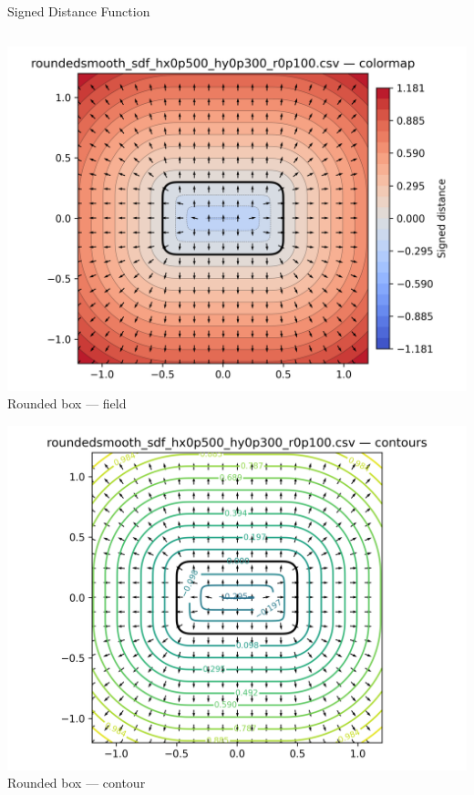 \documentclass[10pt, aspectratio=169]{beamer}
\begin{document}
\begin{frame}{Signed Distance Function}
\begin{columns}[T,onlytextwidth]
\begin{column}{0.65\textwidth}
      \begin{minipage}{\linewidth}
        \begin{minipage}{0.5\linewidth}
          \centering
          \includegraphics[width=\linewidth]{Figures/roundedsmooth_sdf_hx0p500_hy0p300_r0p100_cmap.png}\\[-0.2em]
          \scriptsize Rounded box — field
        \end{minipage}\hfill
        \begin{minipage}{0.5\linewidth}
          \centering
          \includegraphics[width=\linewidth]{Figures/roundedsmooth_sdf_hx0p500_hy0p300_r0p100_contour.png}\\[-0.2em]
          \scriptsize Rounded box — contour
        \end{minipage}
      \end{minipage}
      \vspace{0.6em}


\end{column}
\end{columns}
\end{frame}
\end{document}
